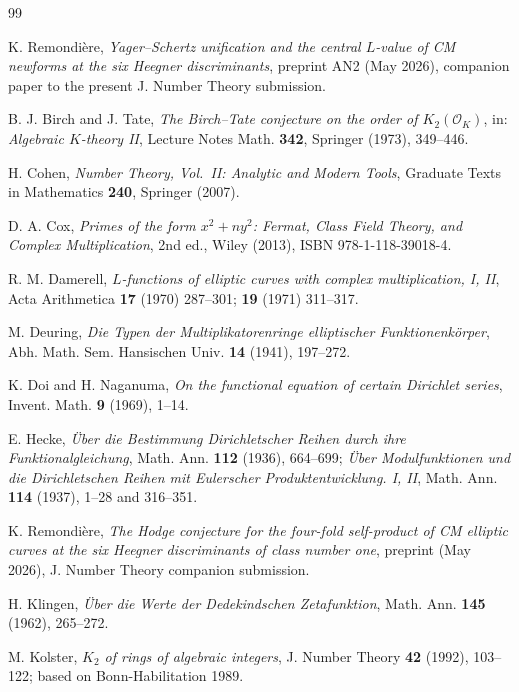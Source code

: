\documentclass[11pt,a4paper]{amsart}
\theoremstyle{definition}
\newcommand{\OK}{\mathcal{O}_K}
\begin{document}
\begin{thebibliography}{99}

 K. Remondi\`ere, \emph{Yager--Schertz unification and the central $L$-value of CM newforms at the six Heegner discriminants}, preprint AN2 (May 2026), companion paper to the present J. Number Theory submission.

 B. J. Birch and J. Tate, \emph{The Birch--Tate conjecture on the order of $K_2(\OK)$}, in: \emph{Algebraic $K$-theory II}, Lecture Notes Math. \textbf{342}, Springer (1973), 349--446.

 H. Cohen, \emph{Number Theory, Vol.\ II: Analytic and Modern Tools}, Graduate Texts in Mathematics \textbf{240}, Springer (2007).

 D. A. Cox, \emph{Primes of the form $x^2 + ny^2$: Fermat, Class Field Theory, and Complex Multiplication}, 2nd ed., Wiley (2013), ISBN 978-1-118-39018-4.

 R. M. Damerell, \emph{$L$-functions of elliptic curves with complex multiplication, I, II}, Acta Arithmetica \textbf{17} (1970) 287--301; \textbf{19} (1971) 311--317.

 M. Deuring, \emph{Die Typen der Multiplikatorenringe elliptischer Funktionenk\"orper}, Abh. Math. Sem. Hansischen Univ. \textbf{14} (1941), 197--272.

 K. Doi and H. Naganuma, \emph{On the functional equation of certain Dirichlet series}, Invent. Math. \textbf{9} (1969), 1--14.

 E. Hecke, \emph{\"Uber die Bestimmung Dirichletscher Reihen durch ihre Funktionalgleichung}, Math. Ann. \textbf{112} (1936), 664--699; \emph{\"Uber Modulfunktionen und die Dirichletschen Reihen mit Eulerscher Produktentwicklung. I, II}, Math. Ann. \textbf{114} (1937), 1--28 and 316--351.

 K. Remondi\`ere, \emph{The Hodge conjecture for the four-fold self-product of CM elliptic curves at the six Heegner discriminants of class number one}, preprint (May 2026), J. Number Theory companion submission.

 H. Klingen, \emph{\"Uber die Werte der Dedekindschen Zetafunktion}, Math. Ann. \textbf{145} (1962), 265--272.

 M. Kolster, \emph{$K_2$ of rings of algebraic integers}, J. Number Theory \textbf{42} (1992), 103--122; based on Bonn-Habilitation 1989.


\end{thebibliography}
\end{document}
